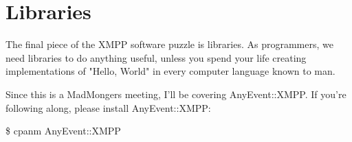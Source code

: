 \section{Libraries}

\pause

The final piece of the XMPP software puzzle is libraries.  As programmers, we need
libraries to do anything useful, unless you spend your life creating implementations of
"Hello, World" in every computer language known to man.

\pause
Since this is a MadMongers meeting, I'll be covering AnyEvent::XMPP.  If you're following along,
please install AnyEvent::XMPP:

\begin{shaded}
\$ cpanm AnyEvent::XMPP
\end{shaded}
